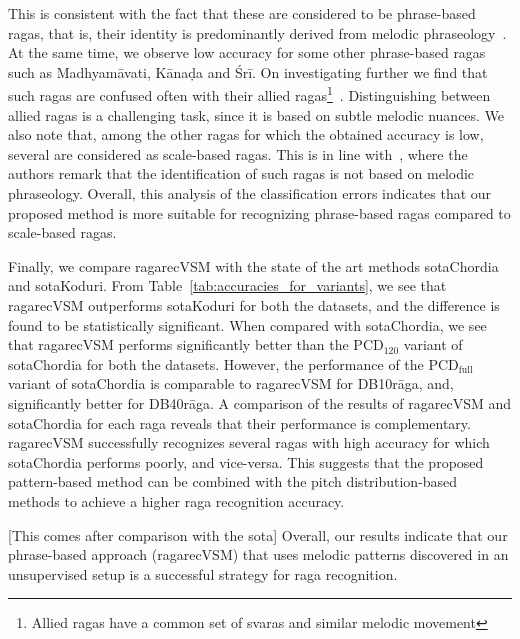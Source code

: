 This is consistent with the fact that these are considered to be phrase-based \glspl{raga}, that is, their identity is predominantly derived from melodic phraseology~\cite{krishna2012carnatic}. At the same time, we observe low accuracy for some other phrase-based \glspl{raga} such as Madhyam\={a}vati, K\={a}na\d{d}a and \'{S}r\={i}. On investigating further we find that such \glspl{raga} are confused often with their allied \glspl{raga}\footnote{Allied \glspl{raga} have a common set of svaras and similar melodic movement}~\cite{krishna2012carnatic}. Distinguishing between allied \glspl{raga} is a challenging task, since it is based on subtle melodic nuances. We also note that, among the other \glspl{raga} for which the obtained accuracy is low, several are considered as scale-based \glspl{raga}. This is in line with~\cite{krishna2012carnatic}, where the authors remark that the identification of such \glspl{raga} is not based on melodic phraseology. Overall, this analysis of the classification errors indicates that our proposed method is more suitable for recognizing phrase-based \glspl{raga} compared to scale-based \glspl{raga}. 


Finally, we compare \acrshort{ragarecVSM} with the state of the art methods \acrshort{sotaChordia} and \acrshort{sotaKoduri}. From Table~\ref{tab:accuracies_for_variants}, we see that \acrshort{ragarecVSM} outperforms \acrshort{sotaKoduri} for both the datasets, and the difference is found to be statistically significant. When compared with \acrshort{sotaChordia}, we see that \acrshort{ragarecVSM} performs significantly better than the $\mathrm{PCD}_{120}$ variant of \acrshort{sotaChordia} for both the datasets. However, the performance of the $\mathrm{PCD}_\mathrm{full}$ variant of \acrshort{sotaChordia} is comparable to \acrshort{ragarecVSM} for DB10r\={a}ga, and, significantly better for DB40r\={a}ga. A comparison of the results of \acrshort{ragarecVSM} and \acrshort{sotaChordia} for each \gls{raga} reveals that their performance is complementary. \acrshort{ragarecVSM} successfully recognizes several \glspl{raga} with high accuracy for which \acrshort{sotaChordia} performs poorly, and vice-versa. This suggests that the proposed pattern-based method can be combined with the pitch distribution-based methods to achieve a higher \gls{raga} recognition accuracy.

[This comes after comparison with the sota] Overall, our results indicate that our phrase-based approach (\acrshort{ragarecVSM}) that uses melodic patterns discovered in an unsupervised setup is a successful strategy for \gls{raga} recognition. 



